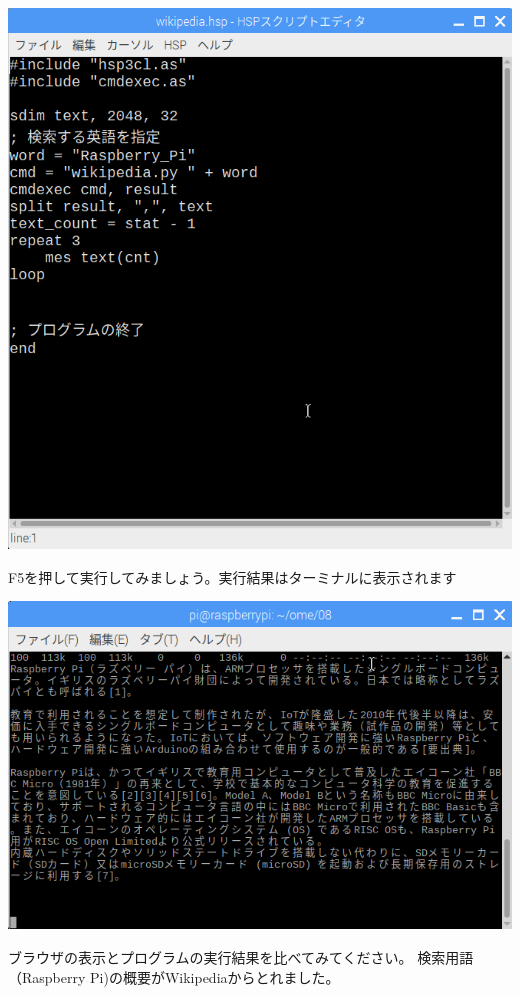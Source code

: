 \documentclass[a4paper,12pt,dvipdfmx]{jarticle}
\begin{document}
\begin{center}
\includegraphics[width=17.006cm]{textbook-img060.png}

\end{center}

\bigskip

\clearpage
F5を押して実行してみましょう。実行結果はターミナルに表示されます



\begin{center}
\includegraphics[width=17.006cm]{textbook-img061.png}

\end{center}
ブラウザの表示とプログラムの実行結果を比べてみてください。
検索用語（Raspberry
Pi)の概要がWikipediaからとれました。
\end{document}
